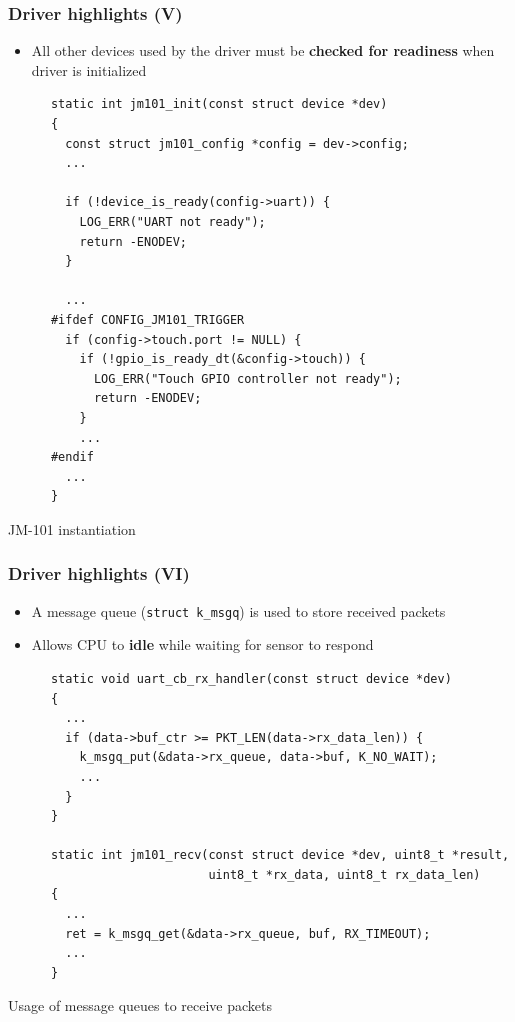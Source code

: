 \documentclass[handout]{beamer}
\begin{document}
\begin{frame}[fragile]
  \frametitle{Driver highlights (V)}

  \begin{itemize}
    \item All other devices used by the driver must be
          \textbf{checked for readiness} when driver is initialized
  \end{itemize}

  \begin{listing}[H]
    \begin{verbatim}
      static int jm101_init(const struct device *dev)
      {
        const struct jm101_config *config = dev->config;
        ...

        if (!device_is_ready(config->uart)) {
          LOG_ERR("UART not ready");
          return -ENODEV;
        }

        ...
      #ifdef CONFIG_JM101_TRIGGER
        if (config->touch.port != NULL) {
          if (!gpio_is_ready_dt(&config->touch)) {
            LOG_ERR("Touch GPIO controller not ready");
            return -ENODEV;
          }
          ...
      #endif
        ...
      }
    \end{verbatim}
    \caption{JM-101 instantiation}
  \end{listing}
\end{frame}

\begin{frame}[fragile]
  \frametitle{Driver highlights (VI)}

  \begin{itemize}
    \item A message queue (\texttt{struct k_msgq}) is used to store
          received packets
    \item Allows CPU to \textbf{idle} while waiting for sensor to respond
  \end{itemize}

  \begin{listing}[H]
    \begin{verbatim}
      static void uart_cb_rx_handler(const struct device *dev)
      {
        ...
        if (data->buf_ctr >= PKT_LEN(data->rx_data_len)) {
          k_msgq_put(&data->rx_queue, data->buf, K_NO_WAIT);
          ...
        }
      }

      static int jm101_recv(const struct device *dev, uint8_t *result,
                            uint8_t *rx_data, uint8_t rx_data_len)
      {
        ...
        ret = k_msgq_get(&data->rx_queue, buf, RX_TIMEOUT);
        ...
      }
    \end{verbatim}
    \caption{Usage of message queues to receive packets}
  \end{listing}
\end{frame}
\end{document}
